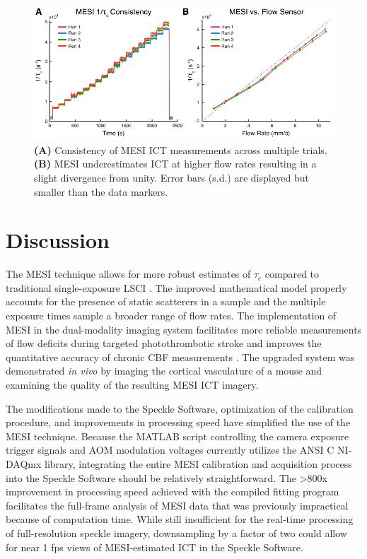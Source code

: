 \begin{figure}
    \includegraphics{figures/chapter_4/microfluidicconsistency.pdf}
    \caption{
        \label{fig:microfluidicconsistency}
        \textbf{(A)} Consistency of MESI ICT measurements across multiple trials. \textbf{(B)} MESI underestimates ICT at higher flow rates resulting in a slight divergence from unity. Error bars (s.d.) are displayed but smaller than the data markers.
    }
\end{figure}



\section{Discussion}

The MESI technique allows for more robust estimates of $\tau_c$ compared to traditional single-exposure LSCI \cite{Parthasarathy:2008el}. The improved mathematical model properly accounts for the presence of static scatterers in a sample and the multiple exposure times sample a broader range of flow rates. The implementation of MESI in the dual-modality imaging system facilitates more reliable measurements of flow deficits during targeted photothrombotic stroke \cite{Parthasarathy:2010vo} and improves the quantitative accuracy of chronic CBF measurements \cite{Kazmi:2013hp}. The upgraded system was demonstrated \textit{in vivo} by imaging the cortical vasculature of a mouse and examining the quality of the resulting MESI ICT imagery.

The modifications made to the Speckle Software, optimization of the calibration procedure, and improvements in processing speed have simplified the use of the MESI technique. Because the MATLAB script controlling the camera exposure trigger signals and AOM modulation voltages currently utilizes the ANSI C NI-DAQmx library, integrating the entire MESI calibration and acquisition process into the Speckle Software should be relatively straightforward. The \textgreater800x improvement in processing speed achieved with the compiled fitting program facilitates the full-frame analysis of MESI data that was previously impractical because of computation time. While still insufficient for the real-time processing of full-resolution speckle imagery, downsampling by a factor of two could allow for near 1 fps views of MESI-estimated ICT in the Speckle Software.

